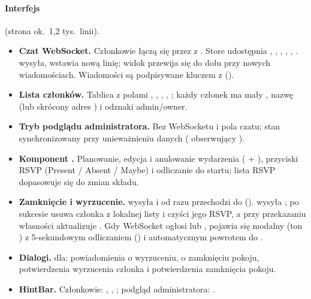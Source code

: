 \paragraph{Interfejs} (strona ok.\ 1,2 tys.\ linii).
\begin{itemize}[nosep]
  \item \textbf{Czat WebSocket.} Członkowie łączą się przez 
        z . Store udostępnia , , ,
        , , .  wysyła,  wstawia nową
        linię; widok przewija się do dołu przy nowych wiadomościach. Wiadomości są podpisywane kluczem
        z  ().
  \item \textbf{Lista członków.} Tablica  z polami , ,
        , , ; każdy członek ma mały , nazwę (lub skrócony adres
        ) i odznaki admin/owner.
  \item \textbf{Tryb podglądu administratora.} Bez WebSocketu i pola czatu; stan synchronizowany
        przy unieważnieniu danych ( obserwujący ).
  \item \textbf{Komponent .} Planowanie, edycja i anulowanie wydarzenia
        ( + ), przyciski RSVP (Present / Absent / Maybe)
        i odliczanie do startu; lista RSVP dopasowuje się do zmian składu.
  \item \textbf{Zamknięcie i wyrzucenie.}  wysyła  i od razu
        przechodzi do  ().  wysyła ;
        po sukcesie usuwa członka z lokalnej listy i czyści jego RSVP, a przy przekazaniu własności
        aktualizuje . Gdy WebSocket ogłosi  lub ,
        pojawia się modalny  (ton ) z 5-sekundowym odliczaniem
        () i automatycznym powrotem do .
  \item \textbf{Dialogi.}  dla: powiadomienia o wyrzuceniu, o zamknięciu pokoju,
        potwierdzenia wyrzucenia członka i potwierdzenia zamknięcia pokoju.
  \item \textbf{HintBar.} Członkowie: , ,
        ; podgląd administratora: .
\end{itemize}

